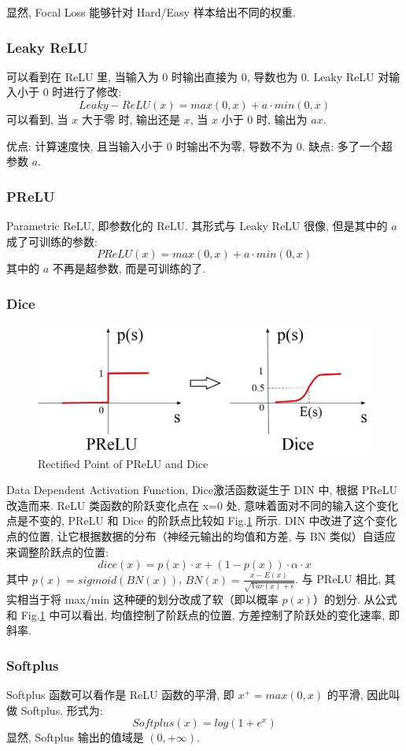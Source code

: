 显然, Focal Loss 能够针对 Hard/Easy 样本给出不同的权重. 

\subsubsection{Leaky ReLU}
可以看到在 ReLU 里, 当输入为 0 时输出直接为 0, 导数也为 0. Leaky ReLU 对输入小于 0 时进行了修改: 
$$
Leaky-ReLU(x) = max(0, x) + a \cdot min(0, x)
$$
可以看到, 当 $x$ 大于零 时, 输出还是 $x$, 当 $x$ 小于 0 时, 输出为 $a x$. 

优点: 计算速度快, 且当输入小于 0 时输出不为零, 导数不为 0. 缺点: 多了一个超参数 $a$. 

\subsubsection{PReLU}
Parametric ReLU, 即参数化的 ReLU. 其形式与 Leaky ReLU 很像, 但是其中的 $a$ 成了可训练的参数: 
$$
PReLU(x) = max(0, x) + a \cdot min(0, x)
$$
其中的 $a$ 不再是超参数, 而是可训练的了. 

\subsubsection{Dice}
\begin{figure}[h]
	\centering
	\includegraphics[width=.6\textwidth]{pics/prelu-dice.png}
	\caption{Rectified Point of PReLU and Dice}
	\label{fig:prelu_dice}
\end{figure}
Data Dependent Activation Function, Dice激活函数诞生于 DIN 中, 根据 PReLU 改造而来. ReLU 类函数的阶跃变化点在 x=0 处, 意味着面对不同的输入这个变化点是不变的, PReLU 和 Dice 的阶跃点比较如 Fig.\ref{fig:prelu_dice} 所示. DIN 中改进了这个变化点的位置, 让它根据数据的分布（神经元输出的均值和方差, 与 BN 类似）自适应来调整阶跃点的位置: 
$$
dice(x) = p(x) \cdot x + (1 - p(x)) \cdot \alpha \cdot x
$$
其中 $p(x) = sigmoid( BN(x))$, $BN(x) = \frac{x - E(x)}{\sqrt{Var(x) + \epsilon}}$. 与 PReLU 相比, 其实相当于将 max/min 这种硬的划分改成了软（即以概率 $p(x)$）的划分. 从公式和 Fig.\ref{fig:prelu_dice} 中可以看出, 均值控制了阶跃点的位置, 方差控制了阶跃处的变化速率, 即斜率. 

\subsubsection{Softplus}
Softplus 函数可以看作是 ReLU 函数的平滑, 即 $x^+ = max(0, x)$ 的平滑, 因此叫做 Softplus. 形式为: 
$$
Softplus(x) = log(1+e^x)
$$
显然, Softplus 输出的值域是 $(0, +\infty)$. 